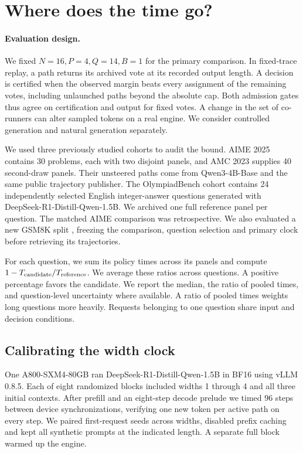 \section{Where does the time go?}\label{sec:exp}
\paragraph{Evaluation design.}
We fixed \(N=16,P=4,Q=14,B=1\) for the primary comparison. In fixed-trace replay, a path returns its archived vote at its recorded output length. A decision is certified when the observed margin beats every assignment of the remaining votes, including unlaunched paths beyond the absolute cap. Both admission gates thus agree on certification and output for fixed votes. A change in the set of co-runners can alter sampled tokens on a real engine. We consider controlled generation and natural generation separately.

We used three previously studied cohorts to audit the bound. AIME 2025 contains 30 problems, each with two disjoint panels, and AMC 2023 supplies 40 second-draw panels. Their unsteered paths come from Qwen3-4B-Base and the same public trajectory publisher. The OlympiadBench cohort \citep{he2024olympiadbench} contains 24 independently selected English integer-answer questions generated with DeepSeek-R1-Distill-Qwen-1.5B. We archived one full reference panel per question. The matched AIME comparison was retrospective. We also evaluated a new GSM8K split \citep{gsm8k}, freezing the comparison, question selection and primary clock before retrieving its trajectories.

For each question, we sum its policy times across its panels and compute \(1-T_{\rm candidate}/T_{\rm reference}\). We average these ratios across questions. A positive percentage favors the candidate. We report the median, the ratio of pooled times, and question-level uncertainty where available. A ratio of pooled times weights long questions more heavily. Requests belonging to one question share input and decision conditions.

\subsection{Calibrating the width clock}
One A800-SXM4-80GB ran DeepSeek-R1-Distill-Qwen-1.5B in BF16 using vLLM 0.8.5. Each of eight randomized blocks included widths 1 through 4 and all three initial contexts. After prefill and an eight-step decode prelude we timed 96 steps between device synchronizations, verifying one new token per active path on every step. We paired first-request seeds across widths, disabled prefix caching and kept all synthetic prompts at the indicated length. A separate full block warmed up the engine.

